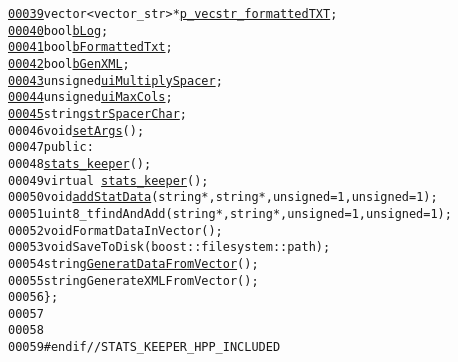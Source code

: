 \begin{footnotesize}
\begin{alltt}
\hypertarget{stats__keeper_8hpp_source_l00039}{}\hyperlink{classstats__keeper_ace46f580da108c5ddbef12d0733f4569}{00039}         vector<vector\_str> *\hyperlink{classstats__keeper_ace46f580da108c5ddbef12d0733f4569}{p_vecstr_formattedTXT}; 
\hypertarget{stats__keeper_8hpp_source_l00040}{}\hyperlink{classstats__keeper_a9d490ff7931f71f3cc8f925b8a7cdd8b}{00040}         \textcolor{keywordtype}{bool} \hyperlink{classstats__keeper_a9d490ff7931f71f3cc8f925b8a7cdd8b}{bLog}; 
\hypertarget{stats__keeper_8hpp_source_l00041}{}\hyperlink{classstats__keeper_a1e4fed8a069f534f85c5bc0b4054bbe6}{00041}         \textcolor{keywordtype}{bool} \hyperlink{classstats__keeper_a1e4fed8a069f534f85c5bc0b4054bbe6}{bFormattedTxt}; 
\hypertarget{stats__keeper_8hpp_source_l00042}{}\hyperlink{classstats__keeper_a575bbfaa39e0f4d816d9229bc5d19795}{00042}         \textcolor{keywordtype}{bool} \hyperlink{classstats__keeper_a575bbfaa39e0f4d816d9229bc5d19795}{bGenXML}; 
\hypertarget{stats__keeper_8hpp_source_l00043}{}\hyperlink{classstats__keeper_a77ee69cc8b6a80296c69b8af4de678f1}{00043}         \textcolor{keywordtype}{unsigned} \hyperlink{classstats__keeper_a77ee69cc8b6a80296c69b8af4de678f1}{uiMultiplySpacer}; 
\hypertarget{stats__keeper_8hpp_source_l00044}{}\hyperlink{classstats__keeper_ac5ad6cbbee0763290d1569ee7ff70b29}{00044}         \textcolor{keywordtype}{unsigned} \hyperlink{classstats__keeper_ac5ad6cbbee0763290d1569ee7ff70b29}{uiMaxCols}; 
\hypertarget{stats__keeper_8hpp_source_l00045}{}\hyperlink{classstats__keeper_acd8f177a6ee5df7bb623685fdf8b7c3c}{00045}         \textcolor{keywordtype}{string} \hyperlink{classstats__keeper_acd8f177a6ee5df7bb623685fdf8b7c3c}{strSpacerChar}; 
00046         \textcolor{keywordtype}{void} \hyperlink{classstats__keeper_af5b6f86db5cbfae21c4055aa498ee426}{setArgs}();
00047     \textcolor{keyword}{public}:
00048         \hyperlink{classstats__keeper_aaae9b4375bd4436758125c29f3d90d8f}{stats_keeper}();
00049         \textcolor{keyword}{virtual} ~\hyperlink{classstats__keeper}{stats_keeper}();
00050         \textcolor{keywordtype}{void} \hyperlink{classstats__keeper_aec5eb085aadb9eb2d29cc83f2d5072a7}{addStatData}(\textcolor{keywordtype}{string} *,\textcolor{keywordtype}{string}*,\textcolor{keywordtype}{unsigned} =1,\textcolor{keywordtype}{unsigned} =1);
00051         uint8\_t findAndAdd(\textcolor{keywordtype}{string}*,\textcolor{keywordtype}{string}*,\textcolor{keywordtype}{unsigned} =1,\textcolor{keywordtype}{unsigned} =1);
00052         \textcolor{keywordtype}{void} FormatDataInVector();
00053         \textcolor{keywordtype}{void} SaveToDisk(boost::filesystem::path);
00054         \textcolor{keywordtype}{string} \hyperlink{classstats__keeper_ab10c9697298961d0411df74d6759b63f}{GeneratDataFromVector}();
00055         \textcolor{keywordtype}{string} GenerateXMLFromVector();
00056 \};
00057 
00058 
00059 \textcolor{preprocessor}{#endif // STATS\_KEEPER\_HPP\_INCLUDED}
\end{alltt}\end{footnotesize}
